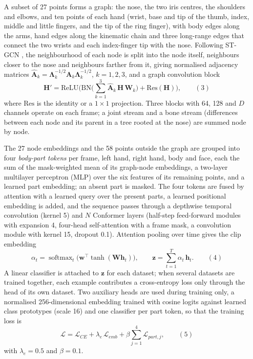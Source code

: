 A subset of 27 points forms a graph: the nose, the two iris centres, the shoulders and elbows, and ten points of each hand (wrist, base and tip of the thumb, index, middle and little fingers, and the tip of the ring finger), with body edges along the arms, hand edges along the kinematic chain and three long-range edges that connect the two wrists and each index-finger tip with the nose. Following ST-GCN \citep{2018_yan_stgcn}, the neighbourhood of each node is split into the node itself, neighbours closer to the nose and neighbours farther from it, giving normalised adjacency matrices \(\widehat{\mathbf{A}}_{k} = \mathbf{\Lambda}_{k}^{-1/2}\mathbf{A}_{k}\mathbf{\Lambda}_{k}^{-1/2}\), \(k = 1, 2, 3\), and a graph convolution block \[\mathbf{H}' = \mathrm{ReLU}\Big(\mathrm{BN}\Big(\sum_{k=1}^{3}\widehat{\mathbf{A}}_{k}\,\mathbf{H}\,\mathbf{W}_{k}\Big) + \mathrm{Res}(\mathbf{H})\Big),\qquad(3)\] where \(\mathrm{Res}\) is the identity or a \(1 \times 1\) projection. Three blocks with 64, 128 and \(D\) channels operate on each frame; a joint stream and a bone stream (differences between each node and its parent in a tree rooted at the nose) are summed node by node.

The 27 node embeddings and the 58 points outside the graph are grouped into four \emph{body-part tokens} per frame, left hand, right hand, body and face, each the sum of the mask-weighted mean of its graph-node embeddings, a two-layer multilayer perceptron (MLP) over the six features of its remaining points, and a learned part embedding; an absent part is masked. The four tokens are fused by attention with a learned query over the present parts, a learned positional embedding is added, and the sequence passes through a depthwise temporal convolution (kernel 5) and \(N\) Conformer layers \citep{2020_gulati_conformer} (half-step feed-forward modules with expansion 4, four-head self-attention with a frame mask, a convolution module with kernel 15, dropout 0.1). Attention pooling over time gives the clip embedding \[\alpha_{t} = \operatorname{softmax}_{t}\big(\mathbf{w}^{\top}\tanh(\mathbf{W}\mathbf{h}_{t})\big),\qquad \mathbf{z} = \sum_{t=1}^{T}\alpha_{t}\,\mathbf{h}_{t}.\qquad(4)\] A linear classifier is attached to \(\mathbf{z}\) for each dataset; when several datasets are trained together, each example contributes a cross-entropy loss only through the head of its own dataset. Two auxiliary heads are used during training only, a normalised 256-dimensional embedding trained with cosine logits against learned class prototypes (scale 16) and one classifier per part token, so that the training loss is \[\mathcal{L} = \mathcal{L}_{CE} + \lambda_{e}\,\mathcal{L}_{emb} + \beta\sum_{j=1}^{4}\mathcal{L}_{part,j},\qquad(5)\] with \(\lambda_e = 0.5\) and \(\beta = 0.1\).

